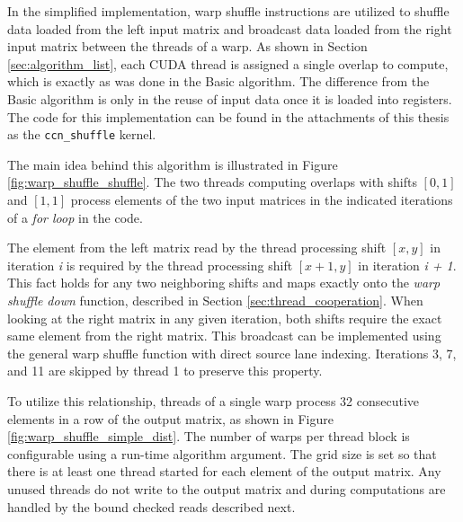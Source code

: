 In the simplified implementation, warp shuffle instructions are utilized to shuffle data loaded from the left input matrix and broadcast data loaded from the right input matrix between the threads of a warp. As shown in Section \ref{sec:algorithm_list}, each CUDA thread is assigned a single overlap to compute, which is exactly as was done in the Basic algorithm. The difference from the Basic algorithm is only in the reuse of input data once it is loaded into registers. The code for this implementation can be found in the attachments of this thesis as the \texttt{ccn\_shuffle} kernel.

The main idea behind this algorithm is illustrated in Figure \ref{fig:warp_shuffle_shuffle}. The two threads computing overlaps with shifts $[0,1]$ and $[1,1]$ process elements of the two input matrices in the indicated iterations of a \textit{for loop} in the code.


The element from the left matrix read by the thread processing shift $[x, y]$ in iteration \textit{i} is required by the thread processing shift $[x + 1,y]$ in iteration \textit{i + 1}. This fact holds for any two neighboring shifts and maps exactly onto the \textit{warp shuffle down} function, described in Section \ref{sec:thread_cooperation}. When looking at the right matrix in any given iteration, both shifts require the exact same element from the right matrix. This broadcast can be implemented using the general warp shuffle function with direct source lane indexing. Iterations 3, 7, and 11 are skipped by thread 1 to preserve this property.


To utilize this relationship, threads of a single warp process 32 consecutive elements in a row of the output matrix, as shown in Figure \ref{fig:warp_shuffle_simple_dist}. The number of warps per thread block is configurable using a run-time algorithm argument. The grid size is set so that there is at least one thread started for each element of the output matrix. Any unused threads do not write to the output matrix and during computations are handled by the bound checked reads described next.

